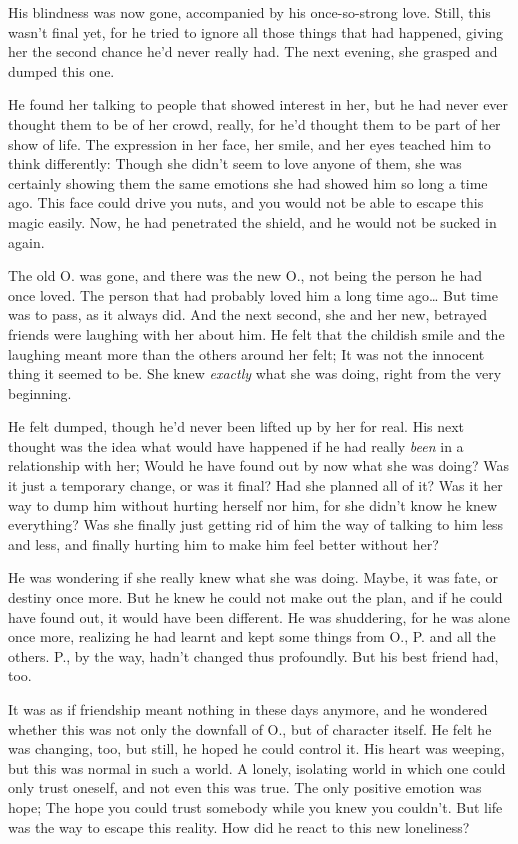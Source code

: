 His blindness was now gone, accompanied by his once-so-strong love. Still, this wasn't final yet, for he tried to ignore all those things that had happened, giving her the second chance he'd never really had. 
The next evening, she grasped and dumped this one.

He found her talking to people that showed interest in her, but he had never ever thought them to be of her crowd, really, for he'd thought them to be part of her show of life. The expression in her face, her smile, and her eyes teached him to think differently: Though she didn't seem to love anyone of them, she was certainly showing them the same emotions she had showed him so long a time ago. This face could drive you nuts, and you would not be able to escape this magic easily. Now, he had penetrated the shield, and he would not be sucked in again.

The old O. was gone, and there was the new O., not being the person he had once loved. The person that had probably loved him a long time ago\dots{}
But time was to pass, as it always did. And the next second, she and her new, betrayed friends were laughing with her about him. 
He felt that the childish smile and the laughing meant more than the others around her felt; It was not the innocent thing it seemed to be. She knew \emph{exactly} what she was doing, right from the very beginning.

He felt dumped, though he'd never been lifted up by her for real. His next thought was the idea what would have happened if he had really \emph{been} in a relationship with her; Would he have found out by now what she was doing? Was it just a temporary change, or was it final? Had she planned all of it? Was it her way to dump him without hurting herself nor him, for she didn't know he knew everything? 
Was she finally just getting rid of him the way of talking to him less and less, and finally hurting him to make him feel better without her?

He was wondering if she really knew what she was doing. Maybe, it was fate, or destiny once more. But he knew he could not make out the plan, and if he could have found out, it would have been different. 
He was shuddering, for he was alone once more, realizing he had learnt and kept some things from O., P. and all the others. P., by the way, hadn't changed thus profoundly. 
But his best friend had, too.

It was as if friendship meant nothing in these days anymore, and he wondered whether this was not only the downfall of O., but of character itself. He felt he was changing, too, but still, he hoped he could control it. His heart was weeping, but this was normal in such a world. 
A lonely, isolating world in which one could only trust oneself, and not even this was true. 
The only positive emotion was hope; The hope you could trust somebody while you knew you couldn't. But life was the way to escape this reality. 
How did he react to this new loneliness?


